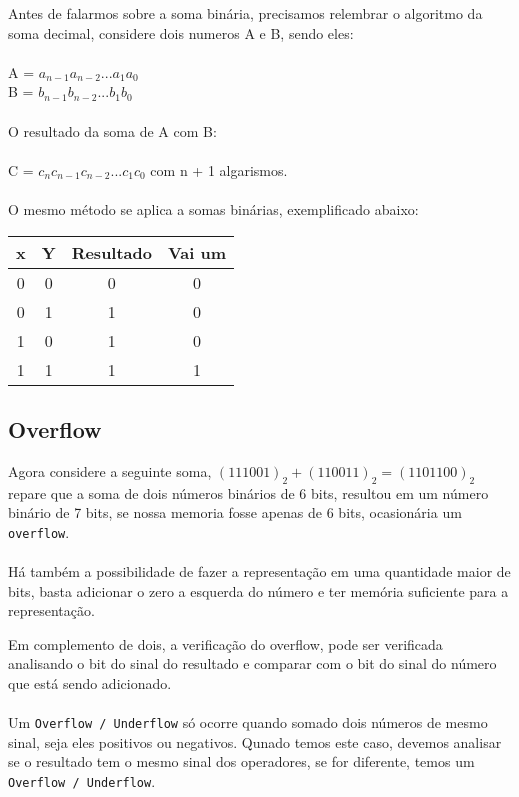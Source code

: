 \documentclass[12pt, onecolumn]{article}
\begin{document}
	Antes de falarmos sobre a soma binária, precisamos relembrar o algoritmo da
	soma decimal, considere dois numeros A e B, sendo eles:\\
	\\
	A = $a_{n-1} a_{n-2} ... a_1 a_0$\\
	B = $b_{n-1} b_{n-2} ... b_1 b_0$\\
	\\
	O resultado da soma de A com B:\\
	\\
	C = $c_n c_{n-1} c_{n-2} ... c_{1} c_{0}$ com n + 1 algarismos.\\
	\\
	O mesmo método se aplica a somas binárias, exemplificado abaixo:
	\begin{table}[h]
		\begin{tabular}{|c|c|c|c|}
			\hline
			x & Y & Resultado & Vai um \\ \hline
			0 & 0 & 0 & 0 \\ \hline
			0 & 1 & 1 & 0 \\ \hline
			1 & 0 & 1 & 0 \\ \hline
			1 & 1 & 1 & 1 \\ \hline
		\end{tabular}
	\end{table}
	
			\subsection{\centering Overflow}

	Agora considere a seguinte soma, $(111001)_2 + (110011)_2 = (1101100)_2$ 
	repare que a soma de dois números binários de 6 bits, resultou em um número
	binário de 7 bits, se nossa memoria fosse apenas de 6 bits, ocasionária um 
	\texttt{overflow}.\\
	\\
	Há também a possibilidade de fazer a representação em uma quantidade maior de
	bits, basta adicionar o zero a esquerda do número e ter memória suficiente 
	para a representação.

	Em complemento de dois, a verificação do overflow, pode ser verificada
	analisando o bit do sinal do resultado e comparar com o bit do sinal
	do número que está sendo adicionado.\\
	\\
	Um \texttt{Overflow / Underflow} só ocorre quando somado dois números de 
	mesmo sinal, seja eles positivos ou negativos. Qunado temos este caso, 
	devemos analisar se o resultado tem o mesmo sinal dos operadores, se for
	diferente, temos um \texttt{Overflow / Underflow}.
\end{document}

